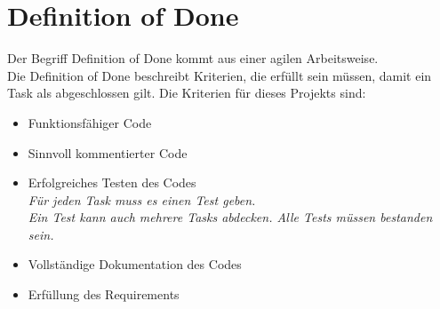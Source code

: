 \section{Definition of Done}\label{sec:dod}

Der Begriff Definition of Done kommt aus einer agilen Arbeitsweise.\\
Die Definition of Done beschreibt Kriterien, die erfüllt sein müssen, damit ein Task als abgeschlossen gilt.
Die Kriterien für dieses Projekts sind:
\begin{itemize}
    \item Funktionsfähiger Code
    \item Sinnvoll kommentierter Code
    \item Erfolgreiches Testen des Codes\\ \textit{Für jeden Task muss es einen Test geben.
    \\Ein Test kann auch mehrere Tasks abdecken. Alle Tests müssen bestanden sein.}
    \item Vollständige Dokumentation des Codes
    \item Erfüllung des Requirements
    
\end{itemize}